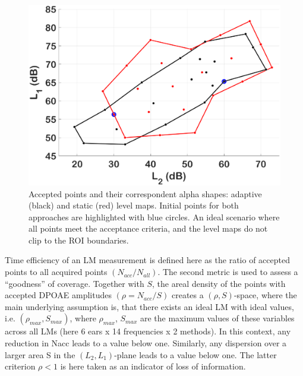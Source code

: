 \documentclass[journal,twoside,web]{ieeecolor2}
\begin{document}
\begin{figure}[ht]
\centerline{\includegraphics[width=\columnwidth]{Fig_3_connectivity.eps}}
\caption{Accepted points and their correspondent alpha shapes: adaptive (black) and static (red) level maps. Initial points for both approaches are highlighted with blue circles. An ideal scenario where all points meet the acceptance criteria, and the level maps do not clip to the ROI boundaries.}
\label{fig_CNT}
\end{figure}

Time efficiency of an LM measurement is defined here as the ratio of accepted points to all acquired points $(N_{acc}/N_{all})$. The second metric is used to assess a “goodness” of coverage. Together with $S$, the areal density of the points with accepted DPOAE amplitudes $(\rho = N_{acc} / S)$ creates a $(\rho, S)$-space, where the main underlying assumption is, that there exists an ideal LM with ideal values, i.e. $(\rho _{max}, S_{max})$, where $\rho _{max}$, $S_{max}$ are the maximum values of these variables across all LMs (here 6 ears x 14 frequencies x 2 methods). In this context, any reduction in Nacc leads to a value below one. Similarly, any dispersion over a larger area S in the $(L_2, L_1)$-plane leads to a value below one. The latter criterion $\rho < 1$  is here taken as an indicator of loss of information.
\end{document}
